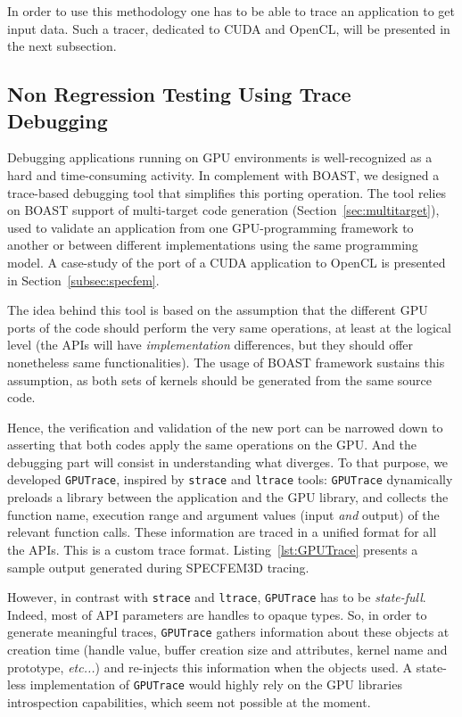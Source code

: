 \documentclass{IEEEtran}
\newcommand{\latin}[1]{\textit{#1}}
\newcommand{\etc}[1]{\latin{etc...}}
\newcommand{\code}[1]{\texttt{#1}}
\begin{document}
In order to use this methodology one has to be able to trace an application to
get input data. Such a tracer, dedicated to CUDA and OpenCL, will be presented
in the next subsection.

\subsection{Non Regression Testing Using Trace Debugging\label{sec:gputrace}}

Debugging applications running on GPU environments is well-recognized as a hard
and time-consuming activity. In complement with BOAST, we designed a trace-based
debugging tool that simplifies this porting operation. The tool relies on BOAST
support of multi-target code generation (Section~\ref{sec:multitarget}), used to
validate an application from one GPU-programming framework to another or between
different implementations using the same programming model. A case-study of the
port of a CUDA application to OpenCL is presented in
Section~\ref{subsec:specfem}.

The idea behind this tool is based on the assumption that the different GPU
ports of the code should perform the very same operations, at least at the
logical level (the APIs will have \emph{implementation} differences, but they
should offer nonetheless same functionalities). The usage of BOAST framework
sustains this assumption, as both sets of kernels should be generated from the
same source code.

Hence, the verification and validation of the new port can be narrowed down to
asserting that both codes apply the same operations on the GPU. And the
debugging part will consist in understanding what diverges. To that purpose, we
developed \code{GPUTrace}, inspired by \code{strace} and \code{ltrace} tools:
\code{GPUTrace} dynamically preloads a library between the application and the
GPU library, and collects the function name, execution range and argument
values (input \emph{and} output) of the relevant function calls. These
information are traced in a unified format for all the APIs. This is a custom
trace format. Listing~\ref{lst:GPUTrace} presents a sample output generated
during SPECFEM3D tracing.

However, in contrast with \code{strace} and \code{ltrace}, \code{GPUTrace} has
to be \emph{state-full}. Indeed, most of API parameters are handles to opaque
types. So, in order to generate meaningful traces, \code{GPUTrace} gathers
information about these objects at creation time (handle value, buffer creation
size and attributes, kernel name and prototype, \etc{}) and re-injects this
information when the objects used. A state-less implementation of
\code{GPUTrace} would highly rely on the GPU libraries introspection
capabilities, which seem not possible at the moment.
\end{document}
